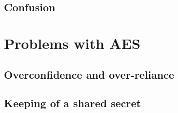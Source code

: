 \documentclass[12pt]{report}
\begin{document}
\subsection{Confusion}

\section{Problems with AES}

\subsection{Overconfidence and over-reliance}

\subsection{Keeping of a shared secret}

\printbibliography
\end{document}
